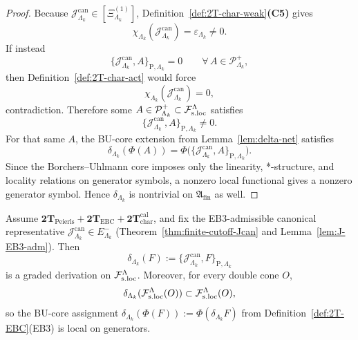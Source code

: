 \begin{proof}
Because
\(\mathcal J^{\mathrm{can}}_{\Lambda_k}\in[\Xi^{(1)}_{\Lambda_k}]\),
Definition~\ref{def:2T-char-weak}\textnormal{\textbf{(C5)}} gives
\[
\chi_{\Lambda_k}(\mathcal J^{\mathrm{can}}_{\Lambda_k})
=
\varepsilon_{\Lambda_k}\neq 0.
\]
If instead
\[
\{\mathcal J^{\mathrm{can}}_{\Lambda_k},A\}_{\mathrm P,\Lambda_k}=0
\qquad
\forall\,A\in\mathcal P^+_{\Lambda_k},
\]
then Definition~\ref{def:2T-char-act} would force
\[
\chi_{\Lambda_k}(\mathcal J^{\mathrm{can}}_{\Lambda_k})=0,
\]
contradiction. Therefore some
\(
A\in\mathcal P^+_{\Lambda_k}\subset\mathcal F_{\mathrm{s.loc}}^\Lambda
\)
satisfies
\[
\{\mathcal J^{\mathrm{can}}_{\Lambda_k},A\}_{\mathrm P,\Lambda_k}\neq 0.
\]
For that same \(A\), the BU-core extension from Lemma~\ref{lem:delta-net} satisfies
\[
\delta_{\Lambda_k}(\Phi(A))
=
\Phi\!\bigl(\{\mathcal J^{\mathrm{can}}_{\Lambda_k},A\}_{\mathrm P,\Lambda_k}\bigr).
\]
Since the Borchers--Uhlmann core imposes only the linearity, *-structure, and
locality relations on generator symbols, a nonzero local functional gives a
nonzero generator symbol. Hence \(\delta_{\Lambda_k}\) is nontrivial on
\(\mathfrak A_{\mathrm{fin}}\) as well.
\end{proof}

\begin{lemma}
\label{lem:Main-delta-derivation}
Assume
\(\mathbf{2T}_{\mathrm{Peierls}}+\mathbf{2T}_{\mathrm{EBC}}+\mathbf{2T}_{\mathrm{char}}^{\mathrm{cal}}\),
and fix the EB3-admissible canonical representative
\(\mathcal J^{\mathrm{can}}_{\Lambda_k}\in E^-_{\Lambda_k}\)
\textnormal{(Theorem~\ref{thm:finite-cutoff-Jcan} and Lemma~\ref{lem:J-EB3-adm})}.
Then
\[
\delta_{\Lambda_k}(F):=\{\mathcal J^{\mathrm{can}}_{\Lambda_k},F\}_{\mathrm P,\Lambda_k}
\]
is a graded derivation on \(\mathcal F_{\mathrm{s.loc}}^\Lambda\). Moreover, for every double cone \(O\),
\[
\delta_{\Lambda_k}(\mathcal F_{\mathrm{s.loc}}^\Lambda(O))\subset\mathcal F_{\mathrm{s.loc}}^\Lambda(O),
\]
so the BU-core assignment
\(\delta_{\Lambda_k}(\Phi(F)):=\Phi(\delta_{\Lambda_k}F)\) from
Definition~\ref{def:2T-EBC}\textnormal{(EB3)} is local on generators.
\end{lemma}

